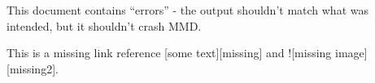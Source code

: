 
\def\mytitle{MultiMarkdown Error Test}

This document contains ``errors'' - the output shouldn't match what was
intended, but it shouldn't crash MMD.

This is a missing link reference [some text][missing] and ![missing image][missing2].




